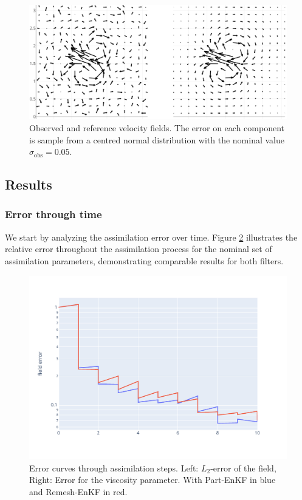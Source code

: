 \begin{figure}[htbp]
	\centering
	\includegraphics[width=0.8\linewidth]{images/app2d/velocity_ref_recadre.pdf}
	\caption{Observed and reference velocity fields. The error on each component is sample from a centred normal distribution with the nominal value $\sigma_{\text{obs}} = 0.05$.}
	\label{fig:velocity}
\end{figure}




\newpage

\subsection{Results}

\subsubsection{Error through time}


We start by analyzing the assimilation error over time. Figure \ref{fig:assim_time} illustrates the relative error throughout the assimilation process for the nominal set of assimilation parameters, demonstrating comparable results for both filters.

\begin{figure}[htbp]
	\centering
	\includegraphics*[width=0.7\linewidth]{images/app2d/field_error_w_assim.pdf}
	\caption{Error curves through assimilation steps. Left: \(L_2\)-error of the field, Right: Error for the viscosity parameter. With Part-EnKF in blue and Remesh-EnKF in red.}
	\label{fig:assim_time}
\end{figure}


